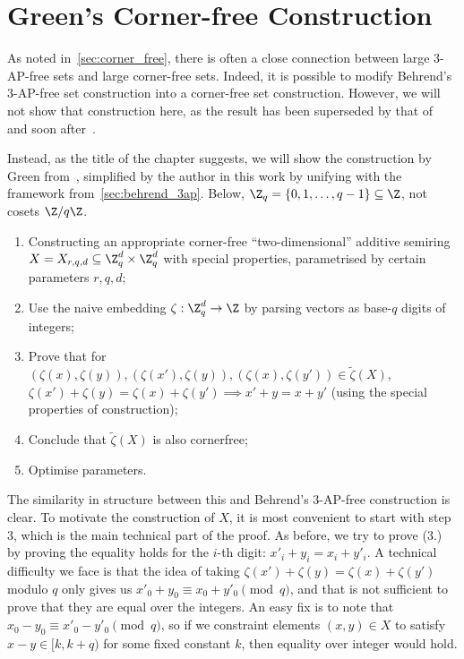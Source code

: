 \section{Green's Corner-free Construction} \label{sec:green_corner_free}

As noted in~\cref{sec:corner_free}, there is often a close connection between large \(3\)-AP-free sets and large corner-free sets. Indeed, it is possible to modify Behrend's \(3\)-AP-free set construction into a corner-free set construction. However, we will not show that construction here, as the result has been superseded by that of~\cite{LinialShraibman2021} and soon after~\cite{Green2021}.

Instead, as the title of the chapter suggests, we will show the construction by Green from~\cite{Green2021}, simplified by the author in this work by unifying with the framework from~\cref{sec:behrend_3ap}. Below, \(\Z_q = \{0, 1, \ldots, q - 1\} \subseteq \Z\), not cosets \(\Z / q\Z\).

\begin{enumerate}
  \item Constructing an appropriate corner-free ``two-dimensional'' additive semiring \(X = X_{r, q, d} \subseteq \Z_q^d \times \Z_q^d\) with special properties, parametrised by certain parameters \(r, q, d\);
  \item Use the naive embedding \(\zeta : \Z_q^d \to \Z\) by parsing vectors as base-\(q\) digits of integers;
  \item Prove that for \((\zeta(x), \zeta(y)), (\zeta(x'), \zeta(y)), (\zeta(x), \zeta(y')) \in \widetilde{\zeta}(X)\), \(\zeta(x') + \zeta(y) = \zeta(x) + \zeta(y') \implies x' + y = x + y'\) (using the special properties of construction);
  \item Conclude that \(\widetilde{\zeta}(X)\) is also cornerfree;
  \item Optimise parameters.
\end{enumerate}

The similarity in structure between this and Behrend's \(3\)-AP-free construction is clear. To motivate the construction of \(X\), it is most convenient to start with step 3, which is the main technical part of the proof. As before, we try to prove (3.) by proving the equality holds for the \(i\)-th digit: \(x'_i + y_i = x_i + y'_i\). A technical difficulty we face is that the idea of taking \(\zeta(x') + \zeta(y) = \zeta(x) + \zeta(y')\) modulo \(q\) only gives us \(x'_0 + y_0 \equiv x_0 + y'_0 \pmod{q}\), and that is not sufficient to prove that they are equal over the integers. An easy fix is to note that \(x_0 - y_0 \equiv x'_0 - y'_0 \pmod{q}\), so if we constraint elements \((x, y) \in X\) to satisfy \(x - y \in [k, k + q)\) for some fixed constant \(k\), then equality over integer would hold.

